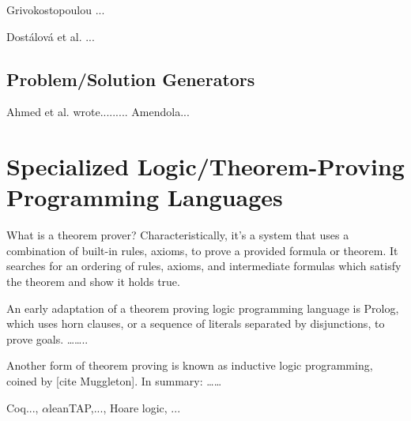 \documentclass[ms]{uncgdissertationexp2}
\theoremstyle{plain}
\theoremstyle{definition}
\theoremstyle{remark}
\begin{document}
Grivokostopoulou \cite{grivokostopoulou}...

Dost\'alov\'a et al. \cite{organon}...

\subsection{Problem/Solution Generators}
Ahmed et al. wrote.........
Amendola... \cite{hardrandom}

\section{Specialized Logic/Theorem-Proving Programming Languages}
What is a theorem prover? Characteristically, it's a system that uses a combination of built-in rules, axioms, to prove a provided formula or theorem. It searches for an ordering of rules, axioms, and intermediate formulas which satisfy the theorem and show it holds true. 

An early adaptation of a theorem proving logic programming language is Prolog, which uses horn clauses, or a sequence of literals separated by disjunctions, to prove goals. ……..

Another form of theorem proving is known as inductive logic programming, coined by [cite Muggleton]. In summary: ……

Coq..., $\alpha$\textsf{lean}TAP,..., Hoare logic, ...
\end{document}
